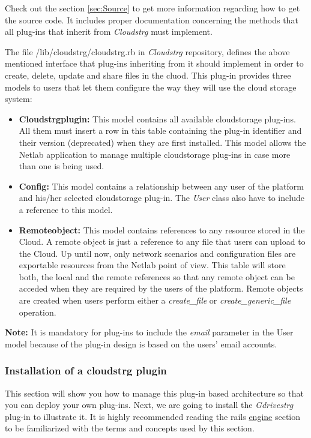 \documentclass{article}
\begin{document}
Check out the section \ref{sec:Source} to get more information regarding how to get the source code. It includes proper documentation concerning the methods that all plug-ins that inherit from \textit{Cloudstrg} must implement.

The file /lib/cloudstrg/cloudstrg.rb in \textit{Cloudstrg} repository, defines the above mentioned interface that plug-ins inheriting from it should implement in order to create, delete, update and share files in the cluod. This plug-in provides three models to users that let them configure the way they will use the cloud storage system:

\begin{itemize}
\item \textbf{Cloudstrgplugin:} This model contains all available cloudstorage plug-ins. All them must insert a row in this table containing the plug-in identifier and their version (deprecated) when they are first installed. This model allows the Netlab application to manage multiple cloudstorage plug-ins in case more than one is being used.
\item \textbf{Config:} This model contains a relationship between any user of the platform and his/her selected cloudstorage plug-in. The \textit{User} class also have to include a reference to this model.
\item \textbf{Remoteobject:} This model contains references to any resource stored in the Cloud. A remote object is just a reference to any file that users can upload to the Cloud. Up until now, only network scenarios and configuration files are exportable resources from the Netlab point of view. This table will store both, the local and the remote references so that any remote object can be acceded when they are required by the users of the platform. Remote objects are created when users perform either a \textit{create\_file} or \textit{create\_generic\_file} operation.
\end{itemize} 

\textbf{Note:} It is mandatory for plug-ins to include the \textit{email} parameter in the User model because of the plug-in design is based on the users' email accounts.

\subsubsection{Installation of a cloudstrg plugin}
This section will show you how to manage this plug-in based architecture so that you can deploy your own plug-ins. Next, we are going to install the \textit{Gdrivestrg} plug-in to illustrate it. It is highly recommended reading the rails \href{http://guides.rubyonrails.org/engines.html}{engine} section to be familiarized with the terms and concepts used by this section.
\end{document}
